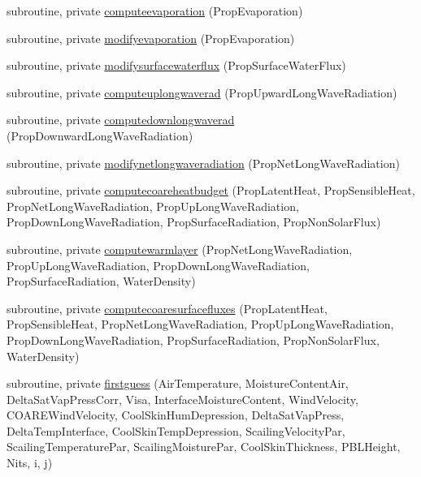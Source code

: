 \begin{DoxyCompactItemize}
\item 
subroutine, private \mbox{\hyperlink{namespacemoduleinterfacewaterair_a808beb15bad5f77afa64f469679f1229}{computeevaporation}} (Prop\+Evaporation)
\item 
subroutine, private \mbox{\hyperlink{namespacemoduleinterfacewaterair_a0c61f58f27a4d911118aadbccbbd1920}{modifyevaporation}} (Prop\+Evaporation)
\item 
subroutine, private \mbox{\hyperlink{namespacemoduleinterfacewaterair_a88a4ad4c4d7d19f977f8154341d169fd}{modifysurfacewaterflux}} (Prop\+Surface\+Water\+Flux)
\item 
subroutine, private \mbox{\hyperlink{namespacemoduleinterfacewaterair_a6cfc460eb2c0c3821a172285fe7ae066}{computeuplongwaverad}} (Prop\+Upward\+Long\+Wave\+Radiation)
\item 
subroutine, private \mbox{\hyperlink{namespacemoduleinterfacewaterair_ae3df7c61e2dbd50895d272ec3bdb3d28}{computedownlongwaverad}} (Prop\+Downward\+Long\+Wave\+Radiation)
\item 
subroutine, private \mbox{\hyperlink{namespacemoduleinterfacewaterair_a446911b7d3595fa04059369d70ebf75e}{modifynetlongwaveradiation}} (Prop\+Net\+Long\+Wave\+Radiation)
\item 
subroutine, private \mbox{\hyperlink{namespacemoduleinterfacewaterair_a1210cfaa400404020add49f99363970b}{computecoareheatbudget}} (Prop\+Latent\+Heat, Prop\+Sensible\+Heat, Prop\+Net\+Long\+Wave\+Radiation, Prop\+Up\+Long\+Wave\+Radiation, Prop\+Down\+Long\+Wave\+Radiation, Prop\+Surface\+Radiation, Prop\+Non\+Solar\+Flux)
\item 
subroutine, private \mbox{\hyperlink{namespacemoduleinterfacewaterair_a4dbe6db87de8afe751f851ce37f72dda}{computewarmlayer}} (Prop\+Net\+Long\+Wave\+Radiation, Prop\+Up\+Long\+Wave\+Radiation, Prop\+Down\+Long\+Wave\+Radiation, Prop\+Surface\+Radiation, Water\+Density)
\item 
subroutine, private \mbox{\hyperlink{namespacemoduleinterfacewaterair_a542e31b196bb8758541444a1a4f7bd77}{computecoaresurfacefluxes}} (Prop\+Latent\+Heat, Prop\+Sensible\+Heat, Prop\+Net\+Long\+Wave\+Radiation, Prop\+Up\+Long\+Wave\+Radiation, Prop\+Down\+Long\+Wave\+Radiation, Prop\+Surface\+Radiation, Prop\+Non\+Solar\+Flux, Water\+Density)
\item 
subroutine, private \mbox{\hyperlink{namespacemoduleinterfacewaterair_ae6acdb7a76bd3e0edd25e31a74d3ab48}{firstguess}} (Air\+Temperature, Moisture\+Content\+Air, Delta\+Sat\+Vap\+Press\+Corr, Visa, Interface\+Moisture\+Content, Wind\+Velocity, C\+O\+A\+R\+E\+Wind\+Velocity, Cool\+Skin\+Hum\+Depression, Delta\+Sat\+Vap\+Press, Delta\+Temp\+Interface, Cool\+Skin\+Temp\+Depression, Scailing\+Velocity\+Par, Scailing\+Temperature\+Par, Scailing\+Moisture\+Par, Cool\+Skin\+Thickness, P\+B\+L\+Height, Nits, i, j)

\end{DoxyCompactItemize}
